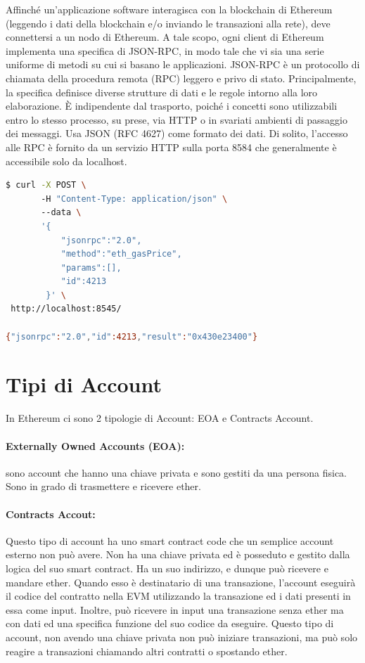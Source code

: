 Affinché un'applicazione software interagisca con la blockchain di Ethereum
(leggendo i dati della blockchain e/o inviando le transazioni alla rete), deve connettersi a
un nodo di Ethereum.
A tale scopo, ogni client di Ethereum implementa una specifica di JSON-RPC, in modo tale che vi
sia una serie uniforme di metodi su cui si basano le applicazioni.
JSON-RPC è un protocollo di chiamata della procedura remota (RPC) leggero e privo di stato.
Principalmente, la specifica definisce diverse strutture di dati e le regole intorno alla loro
elaborazione. È indipendente dal trasporto, poiché i concetti sono utilizzabili entro lo stesso
processo, su prese, via HTTP o in svariati ambienti di passaggio dei messaggi. Usa JSON (RFC 4627)
come formato dei dati.
Di solito, l'accesso alle RPC è fornito da un servizio HTTP sulla porta 8584 che
generalmente è accessibile solo da localhost.

\begin{lstlisting}[language=Bash, caption=Esempio di richiesta tramite jsonrpc]
$ curl -X POST \ 
       -H "Content-Type: application/json" \  
       --data \
       '{
           "jsonrpc":"2.0",
           "method":"eth_gasPrice",
           "params":[],
           "id":4213
        }' \
 http://localhost:8545/
 
{"jsonrpc":"2.0","id":4213,"result":"0x430e23400"}
\end{lstlisting}

\section{Tipi di Account}

In Ethereum ci sono 2 tipologie di Account: EOA e Contracts Account.

\paragraph{Externally Owned Accounts (EOA):}
sono account che hanno una chiave privata e sono gestiti da una persona fisica.
Sono in grado di trasmettere e ricevere ether.

\paragraph{Contracts Accout:}
Questo tipo di account ha uno smart contract code che un semplice account esterno non può avere.
Non ha una chiave privata ed è posseduto e gestito dalla logica del suo smart contract.
Ha un suo indirizzo, e dunque può ricevere e mandare ether.
Quando esso è destinatario di una transazione, l'account eseguirà il codice del contratto
nella EVM utilizzando la transazione ed i dati presenti in essa come input.
Inoltre, può ricevere in input una transazione senza ether ma con dati ed una specifica
funzione del suo codice da eseguire. Questo tipo di account, non avendo una chiave privata
non può iniziare transazioni, ma può solo reagire a transazioni chiamando altri contratti o
spostando ether.

